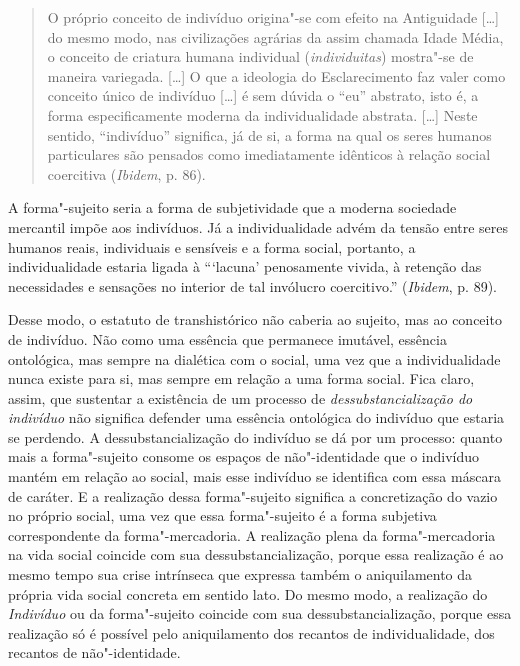 \begin{quote}
O próprio conceito de indivíduo origina"-se com efeito na Antiguidade
[\ldots{}] do mesmo modo, nas civilizações agrárias da assim chamada
Idade Média, o conceito de criatura humana individual
(\emph{individuitas}) mostra"-se de maneira variegada. [\ldots{}] O que a
ideologia do Esclarecimento faz valer como conceito único de indivíduo
[\ldots{}] é sem dúvida o ``eu'' abstrato, isto é, a forma
especificamente moderna da individualidade abstrata. [\ldots{}] Neste
sentido, ``indivíduo'' significa, já de si, a forma na qual os seres
humanos particulares são pensados como imediatamente idênticos à relação
social coercitiva (\emph{Ibidem}, p. 86).
\end{quote}

A forma"-sujeito seria a forma de subjetividade que a moderna sociedade
mercantil impõe aos indivíduos. Já a individualidade advém da tensão
entre seres humanos reais, individuais e sensíveis e a forma social,
portanto, a individualidade estaria ligada à ```lacuna' penosamente
vivida, à retenção das necessidades e sensações no interior de tal
invólucro coercitivo.'' (\emph{Ibidem}, p. 89).

Desse modo, o estatuto de transhistórico não caberia ao sujeito, mas ao
conceito de indivíduo. Não como uma essência que permanece imutável,
essência ontológica, mas sempre na dialética com o social, uma vez que a
individualidade nunca existe para si, mas sempre em relação a uma forma
social. Fica claro, assim, que sustentar a existência de um processo de
\emph{dessubstancialização do indivíduo} não significa defender uma
essência ontológica do indivíduo que estaria se perdendo. A
dessubstancialização do indivíduo se dá por um processo: quanto mais
a forma"-sujeito consome os espaços de não"-identidade que o indivíduo
mantém em relação ao social, mais esse indivíduo se identifica com essa
máscara de caráter. E a realização dessa forma"-sujeito significa a
concretização do vazio no próprio social, uma vez que essa forma"-sujeito
é a forma subjetiva correspondente da forma"-mercadoria. A realização
plena da forma"-mercadoria na vida social coincide com sua
dessubstancialização, porque essa realização é ao mesmo tempo sua crise intrínseca
que expressa também o aniquilamento da própria vida social concreta em sentido lato.
Do mesmo modo, a realização do \emph{Indivíduo} ou da forma"-sujeito coincide com
sua dessubstancialização, porque essa realização só é possível pelo
aniquilamento dos recantos de individualidade, dos recantos de
não"-identidade.

